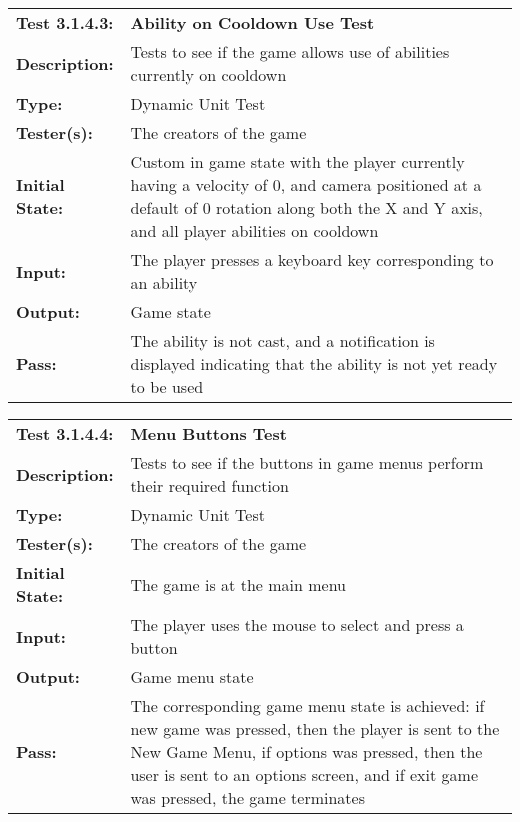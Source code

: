 \documentclass[12pt, titlepage]{article}
\begin{document}
\begin{mdframed}[linewidth=1pt]
\begin{tabularx}{\textwidth}{@{}p{3cm}X@{}}
{\bf Test 3.1.4.3:} & {\bf Ability on Cooldown Use Test}\\[\baselineskip]
{\bf Description:} & Tests to see if the game allows use of abilities currently on cooldown\\[0.5\baselineskip]
{\bf Type:} & Dynamic Unit Test\\[0.5\baselineskip]
{\bf Tester(s):} & The creators of the game\\[0.5\baselineskip]
{\bf Initial State:} & Custom in game state with the player currently having a velocity of 0, and camera positioned at a default of 0 rotation along both the X and Y axis, and all player abilities on cooldown\\[0.5\baselineskip]
{\bf Input:} & The player presses a keyboard key corresponding to an ability \\[0.5\baselineskip]
{\bf Output:} & Game state\\[0.5\baselineskip]
{\bf Pass:} & The ability is not cast, and a notification is displayed indicating that the ability is not yet ready to be used
\end{tabularx}
\end{mdframed}

\begin{mdframed}[linewidth=1pt]
\begin{tabularx}{\textwidth}{@{}p{3cm}X@{}}
{\bf Test 3.1.4.4:} & {\bf Menu Buttons Test}\\[\baselineskip]
{\bf Description:} & Tests to see if the buttons in game menus perform their required function\\[0.5\baselineskip]
{\bf Type:} & Dynamic Unit Test\\[0.5\baselineskip]
{\bf Tester(s):} & The creators of the game\\[0.5\baselineskip]
{\bf Initial State:} & The game is at the main menu\\[0.5\baselineskip]
{\bf Input:} & The player uses the mouse to select and press a button \\[0.5\baselineskip]
{\bf Output:} & Game menu state\\[0.5\baselineskip]
{\bf Pass:} & The corresponding game menu state is achieved: if new game was pressed, then the player is sent to the New Game Menu, if options was pressed, then the user is sent to an options screen, and if exit game was pressed, the game terminates
\end{tabularx}
\end{mdframed}
\end{document}
